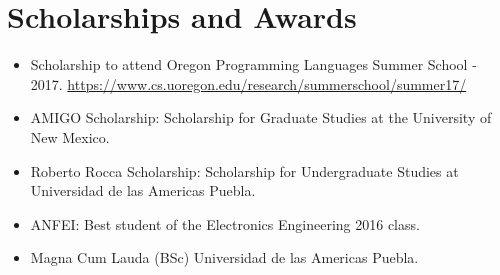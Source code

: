 \section{Scholarships and Awards}

\begin{itemize}
  \item Scholarship to attend Oregon Programming Languages Summer School - 2017.
    \url{https://www.cs.uoregon.edu/research/summerschool/summer17/}
  \item AMIGO Scholarship: Scholarship for Graduate Studies
    at the University of New Mexico.
  \item Roberto Rocca Scholarship: Scholarship for Undergraduate
    Studies at Universidad de las Americas Puebla.
  \item ANFEI: Best student of the Electronics Engineering 2016
    class.
  \item Magna Cum Lauda (BSc) Universidad de las
    Americas Puebla.
\end{itemize}
